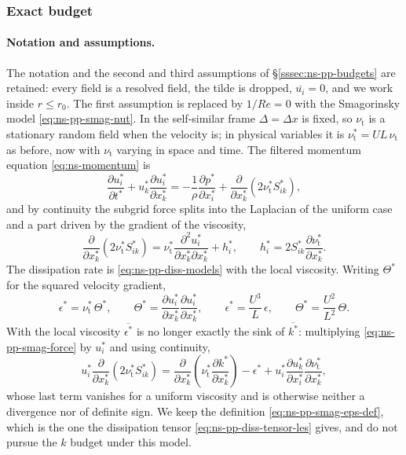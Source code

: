 \documentclass{article}
\begin{document}
\subsubsection{Exact budget}\label{sssec:ns-pp-eps-smag-exact}
\paragraph{Notation and assumptions.}
The notation and the second and third assumptions of
\S\ref{sssec:ns-pp-budgets} are retained: every field is a resolved field,
the tilde is dropped, $\overline{u_i} = 0$, and we work inside $r \le r_0$.
The first assumption is replaced by $1/Re = 0$ with the Smagorinsky model
\eqref{eq:ns-pp-smag-nut}. In the self-similar frame $\Delta = \Delta x$ is
fixed, so $\nu_{\mathrm{t}}$ is a stationary random field when the velocity
is; in physical variables it is $\nu_{\mathrm{t}}^* = UL\, \nu_{\mathrm{t}}$
as before, now with $\nu_{\mathrm{t}}$ varying in space and time. The
filtered momentum equation \eqref{eq:ns-momentum} is
\begin{equation}\label{eq:ns-pp-smag-momentum}
  \frac{\partial u_i^*}{\partial t^*}
  + u_k^* \frac{\partial u_i^*}{\partial x_k^*}
  = -\frac{1}{\rho}\frac{\partial p^*}{\partial x_i^*}
  + \frac{\partial}{\partial x_k^*}\left( 2 \nu_{\mathrm{t}}^* S_{ik}^* \right) ,
\end{equation}
and by continuity the subgrid force splits into the Laplacian of the uniform
case and a part driven by the gradient of the viscosity,
\begin{equation}\label{eq:ns-pp-smag-force}
  \frac{\partial}{\partial x_k^*}\left( 2 \nu_{\mathrm{t}}^* S_{ik}^* \right)
  = \nu_{\mathrm{t}}^* \frac{\partial^2 u_i^*}{\partial x_k^* \partial x_k^*}
  + h_i^* ,
  \qquad
  h_i^* = 2 S_{ik}^* \frac{\partial \nu_{\mathrm{t}}^*}{\partial x_k^*} .
\end{equation}
The dissipation rate is \eqref{eq:ns-pp-diss-models} with the local
viscosity. Writing $\Theta^*$ for the squared velocity gradient,
\begin{equation}\label{eq:ns-pp-smag-eps-def}
  \epsilon^* = \nu_{\mathrm{t}}^*\, \Theta^* ,
  \qquad
  \Theta^* = \frac{\partial u_i^*}{\partial x_k^*} \frac{\partial u_i^*}{\partial x_k^*} ,
  \qquad
  \epsilon^* = \frac{U^3}{L}\, \epsilon ,
  \qquad
  \Theta^* = \frac{U^2}{L^2}\, \Theta .
\end{equation}
With the local viscosity $\overline{\epsilon^*}$ is no longer exactly the
sink of $\overline{k^*}$: multiplying \eqref{eq:ns-pp-smag-force} by $u_i^*$
and using continuity,
\begin{equation*}
  u_i^* \frac{\partial}{\partial x_k^*}\left( 2 \nu_{\mathrm{t}}^* S_{ik}^* \right)
  = \frac{\partial}{\partial x_k^*}\left( \nu_{\mathrm{t}}^* \frac{\partial k^*}{\partial x_k^*} \right)
  - \epsilon^*
  + u_i^* \frac{\partial u_k^*}{\partial x_i^*} \frac{\partial \nu_{\mathrm{t}}^*}{\partial x_k^*} ,
\end{equation*}
whose last term vanishes for a uniform viscosity and is otherwise neither a
divergence nor of definite sign. We keep the definition
\eqref{eq:ns-pp-smag-eps-def}, which is the one the dissipation tensor
\eqref{eq:ns-pp-diss-tensor-les} gives, and do not pursue the $k$ budget
under this model.
\end{document}

